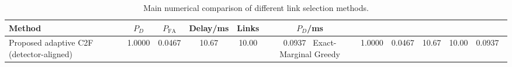 \begin{table}[t]
    \centering
    \caption{Main numerical comparison of different link selection methods.}
    \label{tab:main_summary}
    \begin{tabular}{l c c c c c}
        \hline
        Method & $P_D$ & $P_{\mathrm{FA}}$ & Delay/ms & Links & $P_D$/ms \\
        \hline
        Proposed adaptive C2F (detector-aligned) & 1.0000 & 0.0467 & 10.67 & 10.00 & 0.0937 \
        Exact-Marginal Greedy & 1.0000 & 0.0467 & 10.67 & 10.00 & 0.0937 \
        \hline
    \end{tabular}
\end{table}
